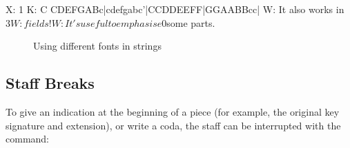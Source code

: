 \documentclass[a4paper,fullpage,12pt]{book}
\begin{document}
\begin{abcsource}
X: 1
K: C
CDEFGABc|cdefgabc'|CCDDEEFF|GGAABBcc|
W: It also works in $3W: fields!
W: It's useful to emphasise $0some parts.
\end{abcsource}

\begin{center}
\begin{figure}[htbp]
\caption{Using different fonts in strings}
\label{fig:setfont}
\end{figure}
\end{center}









\subsection{Staff Breaks}

To give an indication at the beginning of a piece (for example, the
original key signature and extension), or write a coda, the staff can
be interrupted with the  command:
\end{document}

